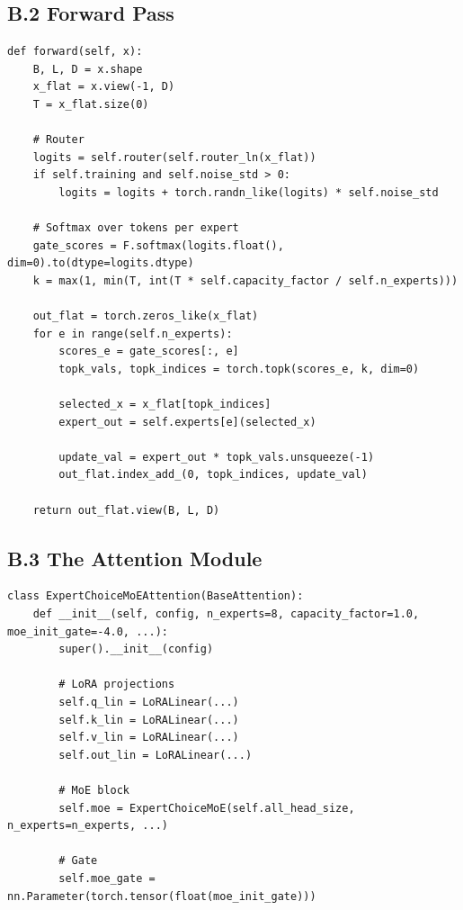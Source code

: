 \subsection{B.2 Forward Pass}

\begin{lstlisting}
def forward(self, x):
    B, L, D = x.shape
    x_flat = x.view(-1, D)
    T = x_flat.size(0)
    
    # Router
    logits = self.router(self.router_ln(x_flat))
    if self.training and self.noise_std > 0:
        logits = logits + torch.randn_like(logits) * self.noise_std
    
    # Softmax over tokens per expert
    gate_scores = F.softmax(logits.float(), dim=0).to(dtype=logits.dtype)
    k = max(1, min(T, int(T * self.capacity_factor / self.n_experts)))
    
    out_flat = torch.zeros_like(x_flat)
    for e in range(self.n_experts):
        scores_e = gate_scores[:, e]
        topk_vals, topk_indices = torch.topk(scores_e, k, dim=0)
        
        selected_x = x_flat[topk_indices]
        expert_out = self.experts[e](selected_x)
        
        update_val = expert_out * topk_vals.unsqueeze(-1)
        out_flat.index_add_(0, topk_indices, update_val)
    
    return out_flat.view(B, L, D)
\end{lstlisting}

\subsection{B.3 The Attention Module}

\begin{lstlisting}
class ExpertChoiceMoEAttention(BaseAttention):
    def __init__(self, config, n_experts=8, capacity_factor=1.0, moe_init_gate=-4.0, ...):
        super().__init__(config)
        
        # LoRA projections
        self.q_lin = LoRALinear(...)
        self.k_lin = LoRALinear(...)
        self.v_lin = LoRALinear(...)
        self.out_lin = LoRALinear(...)
        
        # MoE block
        self.moe = ExpertChoiceMoE(self.all_head_size, n_experts=n_experts, ...)
        
        # Gate
        self.moe_gate = nn.Parameter(torch.tensor(float(moe_init_gate)))
\end{lstlisting}

